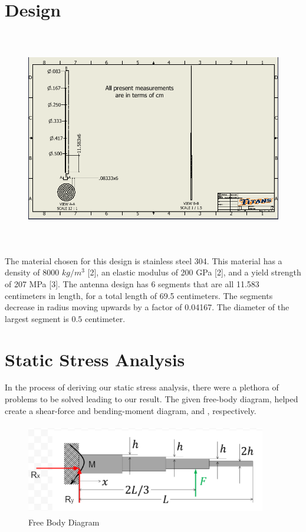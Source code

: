 \documentclass[12pt]{article}
\begin{document}
\section{Design}

\begin{figure}[H]
\centering
\includegraphics[height= 9.5cm, width= 14cm]{Antenna.png}
\end{figure}

The material chosen for this design is stainless steel 304. This material has a density of 8000 $kg/m^3$ [2], an elastic modulus of 200 GPa [2], and a yield strength of 207 MPa [3]. The antenna design has 6 segments that are all 11.583 centimeters in length, for a total length of 69.5 centimeters. The segments decrease in radius moving upwards by a factor of 0.04167. The diameter of the largest segment is $0.5$ centimeter.
\newpage

\section{Static Stress Analysis}
In the process of deriving our static stress analysis, there were a plethora of problems to be solved leading to our result. The given free-body diagram,  helped create a shear-force and bending-moment diagram,  and , respectively.

\begin{figure}[H]
\centering
\includegraphics[height= 4cm, width= 10.5cm]{freebody.png}
\caption{Free Body Diagram}
\label{Figure 1}
\end{figure}
\end{document}
